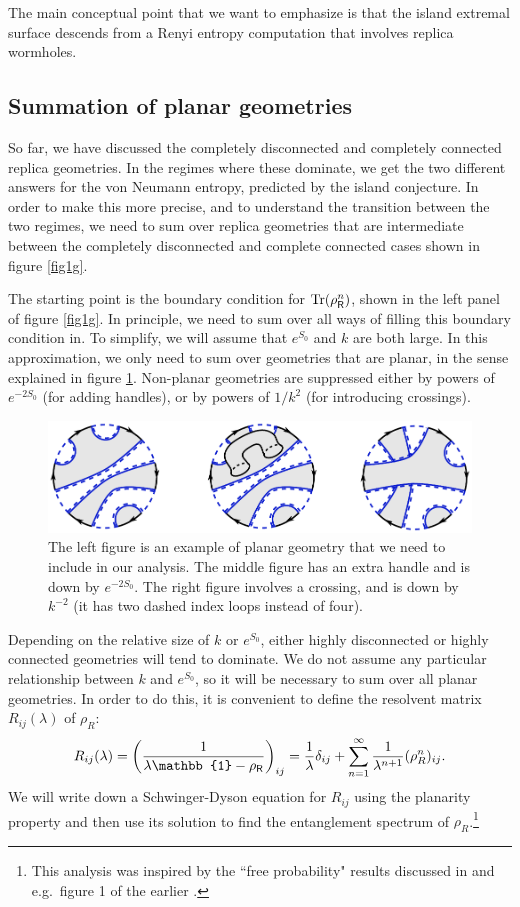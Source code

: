 \documentclass[11pt]{article}
\newcommand{\be}{\begin{equation}}
\newcommand{\ee}{\end{equation}}
\numberwithin{equation}{section}
\def\tr{\text{Tr}}
\begin{document}
The main conceptual point that we want to emphasize is that the island extremal surface descends from a Renyi entropy computation that involves replica wormholes.



\subsection{Summation of planar geometries} \label{sec:sumplanar}
So far, we have discussed the completely disconnected and completely connected replica geometries. In the regimes where these dominate, we get the two different answers for the von Neumann entropy, predicted by the island conjecture. In order to make this more precise, and to understand the transition between the two regimes, we need to sum over replica geometries that are intermediate between the completely disconnected and complete connected cases shown in figure \ref{fig1g}.

The starting point is the boundary condition for $\tr(\rho_{\sf{R}}^n)$, shown in the left panel of figure \ref{fig1g}. In principle, we need to sum over all ways of filling this boundary condition in. To simplify, we will assume that $e^{S_0}$ and $k$ are both large. In this approximation, we only need to sum over geometries that are planar, in the sense explained in figure \ref{fig:Crossing and Handle}. Non-planar geometries are suppressed either by powers of $e^{-2S_0}$ (for adding handles), or by powers of $1/k^2$ (for introducing crossings).
\begin{figure}[ht]
\centering
	\includegraphics[scale=0.7]{images/CrossingAndHandle.pdf}
	\caption{The left figure is an example of planar geometry that we need to include in our analysis. The middle figure has an extra handle and is down by $e^{-2S_0}$. The right figure involves a crossing, and is down by $k^{-2}$ (it has two dashed index loops instead of four).}
	\label{fig:Crossing and Handle}
\end{figure}

Depending on the relative size of $k$ or $e^{S_0}$, either highly disconnected or highly connected geometries will tend to dominate. We do not assume any particular relationship between $k$ and $e^{S_0}$, so it will be necessary to sum over all planar geometries. In order to do this, it is convenient to define the resolvent matrix $R_{ij}(\lambda)$ of $\rho_R$:
\be
R_{ij}(\lambda)=\left(\frac{1}{\lambda\mathbb{1}-\rho_{\sf{R}}}\right)_{ij} = \frac{1}{\lambda}\delta_{ij}+\sum\limits_{n=1}^{\infty}\frac{1}{\lambda^{n+1}}(\rho_R^n)_{ij}.
\ee
We will write down a Schwinger-Dyson equation for $R_{ij}$ using the planarity property and then use its solution to find the entanglement spectrum of $\rho_R$.\footnote{This analysis was inspired by the ``free probability" results discussed in \cite{speicher2009free} and e.g.~figure 1 of the earlier \cite{Cvitanovic:1980jz}.}
\end{document}
